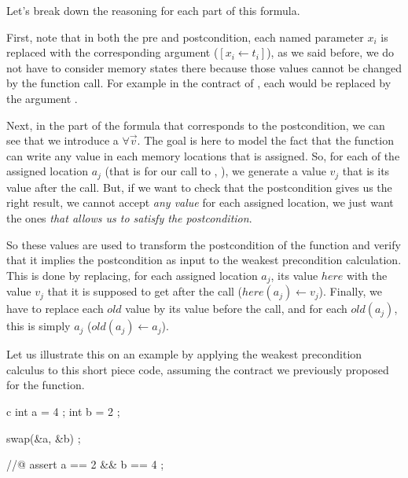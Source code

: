 Let's break down the reasoning for each part of this formula.


First, note that in both the pre and postcondition, each named parameter $x_i$ is
replaced with the corresponding argument ($[x_i \leftarrow t_i]$), as we said
before, we do not have to consider memory states there because those values
cannot be changed by the function call. For example in the contract of
, each  would be replaced by the argument
.



Next, in the part of the formula that corresponds to the postcondition, we can
see that we introduce a $\forall \vec{v}$. The goal is here to model the fact
that the function can write any value in each memory locations that is assigned.
So, for each of the assigned location $a_j$ (that is for our call to
, ), we generate a value $v_j$ that is its
value after the call. But, if we want to check that the postcondition gives us
the right result, we cannot accept \emph{any value} for each assigned location,
we just want the ones \emph{that allows us to satisfy the postcondition}.



So these values are used to transform the postcondition of the function and
verify that it implies the postcondition as input to the weakest
precondition calculation.
This is done by replacing, for each assigned location $a_j$, its value $here$
with the value $v_j$ that it is supposed to get after the call
($here(a_j) \leftarrow v_j$). Finally, we have to replace each $old$ value by
its value before the call, and for each $old(a_j)$, this is simply $a_j$
($old(a_j) \leftarrow a_j$).






Let us illustrate this on an example by applying the weakest precondition
calculus to this short piece code, assuming the contract we previously proposed for
the  function.



\begin{CodeBlock}{c}
  int a = 4 ;
  int b = 2 ;

  swap(&a, &b) ;

  //@ assert a == 2 && b == 4 ;
\end{CodeBlock}



